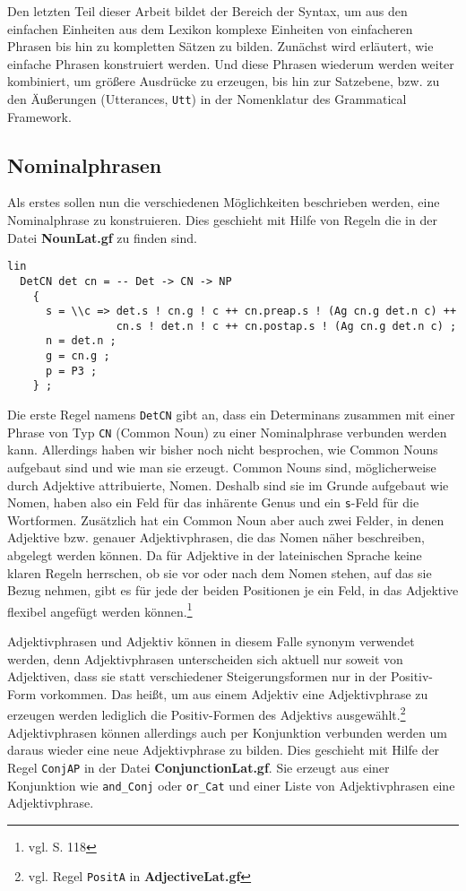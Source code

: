 Den letzten Teil dieser Arbeit bildet der Bereich der Syntax, um aus den einfachen Einheiten aus dem Lexikon komplexe Einheiten von einfacheren Phrasen bis hin zu kompletten Sätzen zu bilden. Zunächst wird erläutert, wie einfache Phrasen konstruiert werden. Und diese Phrasen wiederum werden weiter kombiniert, um größere Ausdrücke zu erzeugen, bis hin zur Satzebene, bzw. zu den Äußerungen (Utterances, \texttt{Utt}) in der Nomenklatur des Grammatical Framework.
\subsection{Nominalphrasen}
\label{subsec:nominalphrasen}
Als erstes sollen nun die verschiedenen Möglichkeiten beschrieben werden, eine Nominalphrase zu konstruieren. Dies geschieht mit Hilfe von Regeln die in der Datei \textbf{NounLat.gf} zu finden sind. \par
\begin{lstlisting}[float=h!tp,caption={Die Syntaxregel \texttt{DetCN}, um ein Determinans und ein Common Nouns zu einer \texttt{NP} zu verbinden (vgl. \textbf{NounLat.gf}},label={GF-Noun-DetCN}]
lin
  DetCN det cn = -- Det -> CN -> NP
    {
      s = \\c => det.s ! cn.g ! c ++ cn.preap.s ! (Ag cn.g det.n c) ++ 
                 cn.s ! det.n ! c ++ cn.postap.s ! (Ag cn.g det.n c) ; 
      n = det.n ;  
      g = cn.g ; 
      p = P3 ;
    } ;
\end{lstlisting}
Die erste Regel namens \texttt{DetCN} gibt an, dass ein Determinans zusammen mit einer Phrase von Typ \texttt{CN} (Common Noun) zu einer Nominalphrase verbunden werden kann. Allerdings haben wir bisher noch nicht besprochen, wie Common Nouns aufgebaut sind und wie man sie erzeugt. Common Nouns sind, möglicherweise durch Adjektive attribuierte, Nomen. Deshalb sind sie im Grunde aufgebaut wie Nomen, haben also ein Feld für das inhärente Genus und ein \texttt{s}-Feld für die Wortformen. Zusätzlich hat ein Common Noun aber auch zwei Felder, in denen Adjektive bzw. genauer Adjektivphrasen, die das Nomen näher beschreiben, abgelegt werden können. Da für Adjektive in der lateinischen Sprache keine klaren Regeln herrschen, ob sie vor oder nach dem Nomen stehen, auf das sie Bezug nehmen, gibt es für jede der beiden Positionen je ein Feld, in das Adjektive flexibel angefügt werden können.\footnote{vgl. \cite{BAYER-LINDAUER1994} S. 118} \par
Adjektivphrasen und Adjektiv können in diesem Falle synonym verwendet werden, denn Adjektivphrasen unterscheiden sich aktuell nur soweit von Adjektiven, dass sie statt verschiedener Steigerungsformen nur in der Positiv-Form vorkommen. Das heißt, um aus einem Adjektiv eine Adjektivphrase zu erzeugen werden lediglich die Positiv-Formen des Adjektivs ausgewählt.\footnote{vgl. Regel \texttt{PositA} in \textbf{AdjectiveLat.gf}} Adjektivphrasen können allerdings auch per Konjunktion verbunden werden um daraus wieder eine neue Adjektivphrase zu bilden. Dies geschieht mit Hilfe der Regel \texttt{ConjAP} in der Datei \textbf{ConjunctionLat.gf}. Sie erzeugt aus einer Konjunktion wie \texttt{and\_Conj} oder \texttt{or\_Cat} und einer Liste von Adjektivphrasen eine Adjektivphrase. \par
